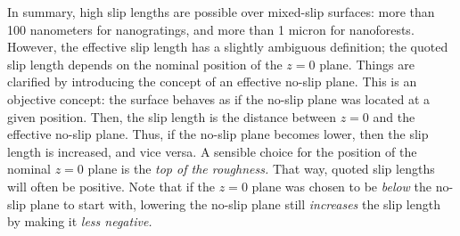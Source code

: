 \documentclass[a4paper]{report}
\begin{document}
In summary, high slip lengths are possible over mixed-slip surfaces: more than 100 nanometers for nanogratings, and more than 1 micron for nanoforests.  However, the effective slip length has a slightly ambiguous definition; the quoted slip length depends on the nominal position of the $z=0$ plane.  Things are clarified by introducing the concept of an effective no-slip plane.  This is an objective concept: the surface behaves as if the no-slip plane was located at a given position.  Then, the slip length is the distance between $z=0$ and the effective no-slip plane.  Thus, if the no-slip plane becomes lower, then the slip length is increased, and vice versa.  A sensible choice for the position of the nominal $z=0$ plane is the \emph{top of the roughness.}  That way, quoted slip lengths will often be positive.  Note that if the $z=0$ plane was chosen to be \emph{below} the no-slip plane to start with, lowering the no-slip plane still \emph{increases} the slip length by making it \emph{less negative.}




\end{document}
